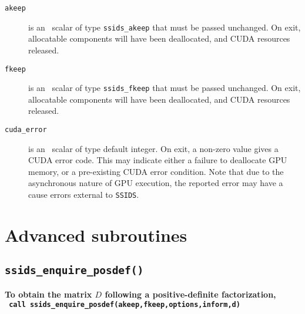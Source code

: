 \begin{description}

\item[\texttt{akeep}] is an \intentinout\ scalar  of type {\tt ssids\_akeep}
that must be passed unchanged.
On exit, allocatable components will have been deallocated, and CUDA resources
released.

\item[\texttt{fkeep}] is an \intentinout\ scalar  of type {\tt ssids\_fkeep}
that must be passed unchanged.
On exit, allocatable components will have been deallocated, and CUDA resources
released.

\item[\texttt{cuda\_error}] is an \intentout\ scalar of type default integer.
On exit, a non-zero value gives a CUDA error code. This may indicate either
a failure to deallocate GPU memory, or a pre-existing CUDA error condition.
Note that due to the asynchronous nature of GPU execution, the
reported error may have a cause errors external to {\tt SSIDS}.

\end{description}

\section{Advanced subroutines}


\subsection{\texttt{ssids\_enquire\_posdef()}}
\textbf{To obtain the matrix $D$ following a positive-definite factorization,
   \vspace*{0.1cm} \\
   \texttt{ \hspace*{0.2cm}
      call ssids\_enquire\_posdef(akeep,fkeep,options,inform,d)
   }
}

